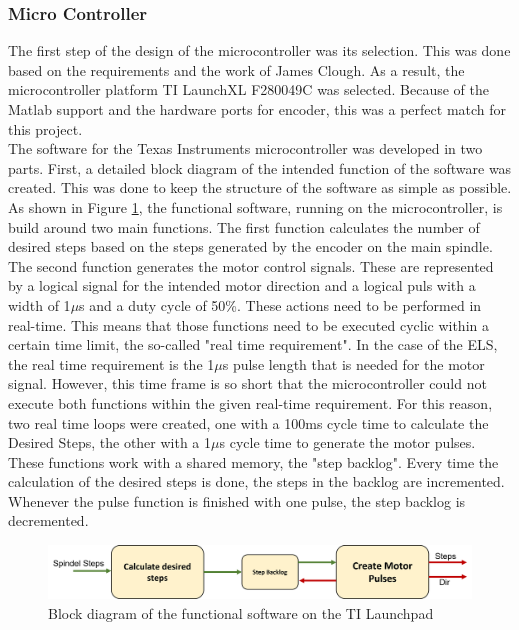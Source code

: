 \subsubsection{Micro Controller}
The first step of the design of the microcontroller was its selection. This was done based on the requirements and the work of James Clough. As a result, the microcontroller platform TI LaunchXL F280049C was selected. Because of the Matlab support and the hardware ports for encoder, this was a perfect match for this project.\\
The software for the Texas Instruments microcontroller was developed in two parts. First, a detailed block diagram of the intended function of the software was created. This was done to keep the structure of the software as simple as possible. As shown in Figure \ref{MicroContBlockDia}, the functional software, running on the microcontroller, is build around two main functions. The first function calculates the number of desired steps based on the steps generated by the encoder on the main spindle. The second function generates the motor control signals. These are represented by a logical signal for the intended motor direction and a logical puls with a width of 1$\mu$s and a duty cycle of 50\%. These actions need to be performed in real-time. This means that those functions need to be executed cyclic within a certain time limit, the so-called "real time requirement". In the case of the ELS, the real time requirement is the 1$\mu$s pulse length that is needed for the motor signal. However, this time frame is so short that the microcontroller could not execute both functions within the given real-time requirement. For this reason, two real time loops were created, one with a 100ms cycle time to calculate the Desired Steps, the other with a 1$\mu$s cycle time to generate the motor pulses. These functions work with a shared memory, the "step backlog". Every time the calculation of the desired steps is done, the steps in the backlog are incremented. Whenever the pulse function is finished with one pulse, the step backlog is decremented.\\
 
 
\begin{figure}
    \begin{center}
    \includegraphics[width=12cm]{Pictures/MicroContBlockDia.png}
    \caption[Block diagram of the functional software on the TI Launchpad]{Block diagram of the functional software on the TI Launchpad}
    \label{MicroContBlockDia}
    \end{center}
\end{figure}
 
